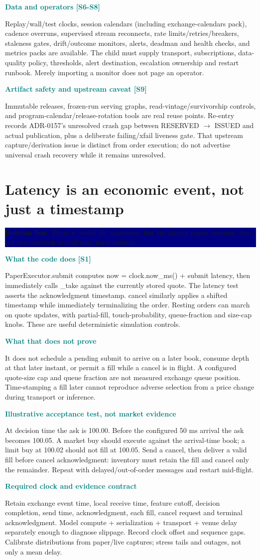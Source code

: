 \documentclass[10pt,letterpaper]{article}
\newcommand{\bl}[1]{\noindent\colorbox{navy}{\parbox{\dimexpr\linewidth-2\fboxsep}{\color{white}\textbf{Bottom line.} #1}}\par\medskip}
\newcommand{\topic}[2]{\clearpage\section{#1}\bl{#2}}
\newcommand{\sub}[1]{\par\textbf{\textcolor{teal}{#1}}\par}
\begin{document}
\sub{Data and operators [S6-S8]}
Replay/wall/test clocks, session calendars (including exchange-calendars pack), cadence overruns, supervised stream reconnects, rate limits/retries/breakers, staleness gates, drift/outcome monitors, alerts, deadman and health checks, and metrics packs are available. The child must supply transport, subscriptions, data-quality policy, thresholds, alert destination, escalation ownership and restart runbook. Merely importing a monitor does not page an operator.
\sub{Artifact safety and upstream caveat [S9]}
Immutable releases, frozen-run serving graphs, read-vintage/survivorship controls, and program-calendar/release-rotation tools are real reuse points. Re-entry records ADR-0157's unresolved crash gap between RESERVED $\rightarrow$ ISSUED and actual publication, plus a deliberate failing/xfail liveness gate. That upstream capture/derivation issue is distinct from order execution; do not advertise universal crash recovery while it remains unresolved.
\topic{Latency is an economic event, not just a timestamp}{There is useful fill machinery, but the shared paper executor does not yet establish arrival-time price realism.}
\sub{What the code does [S1]}
PaperExecutor.submit computes now = clock.now\_ms() + submit latency, then immediately calls \_take against the currently stored quote. The latency test asserts the acknowledgment timestamp. cancel similarly applies a shifted timestamp while immediately terminalizing the order. Resting orders can march on quote updates, with partial-fill, touch-probability, queue-fraction and size-cap knobs. These are useful deterministic simulation controls.
\sub{What that does not prove}
It does not schedule a pending submit to arrive on a later book, consume depth at that later instant, or permit a fill while a cancel is in flight. A configured quote-size cap and queue fraction are not measured exchange queue position. Time-stamping a fill later cannot reproduce adverse selection from a price change during transport or inference.
\sub{Illustrative acceptance test, not market evidence}
At decision time the ask is 100.00. Before the configured 50 ms arrival the ask becomes 100.05. A market buy should execute against the arrival-time book; a limit buy at 100.02 should not fill at 100.05. Send a cancel, then deliver a valid fill before cancel acknowledgment: inventory must retain the fill and cancel only the remainder. Repeat with delayed/out-of-order messages and restart mid-flight.
\sub{Required clock and evidence contract}
Retain exchange event time, local receive time, feature cutoff, decision completion, send time, acknowledgment, each fill, cancel request and terminal acknowledgment. Model compute + serialization + transport + venue delay separately enough to diagnose slippage. Record clock offset and sequence gaps. Calibrate distributions from paper/live captures; stress tails and outages, not only a mean delay.
\end{document}
